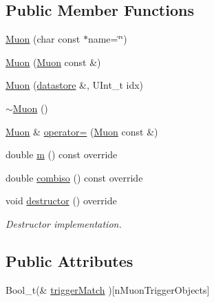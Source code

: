 \subsection*{Public Member Functions}
\begin{DoxyCompactItemize}
\item 
\hyperlink{classpanda_1_1Muon_abbf14d500569593961806573acc254ea}{Muon} (char const $\ast$name=\char`\"{}\char`\"{})
\item 
\hyperlink{classpanda_1_1Muon_a250098913ac74eef61f952c1925c8c16}{Muon} (\hyperlink{classpanda_1_1Muon}{Muon} const \&)
\item 
\hyperlink{classpanda_1_1Muon_ae0f7f7985ce4cdd6031178bf136fd7f3}{Muon} (\hyperlink{structpanda_1_1Element_1_1datastore}{datastore} \&, UInt\_\-t idx)
\item 
\hyperlink{classpanda_1_1Muon_a018a7d87e4d8b9226182c8e668fa081f}{$\sim$Muon} ()
\item 
\hyperlink{classpanda_1_1Muon}{Muon} \& \hyperlink{classpanda_1_1Muon_a2f91424e93572f9efd189884d95efaf6}{operator=} (\hyperlink{classpanda_1_1Muon}{Muon} const \&)
\item 
double \hyperlink{classpanda_1_1Muon_ac5fc1640178d5b0d00dd3eefa6fd44fb}{m} () const override
\item 
double \hyperlink{classpanda_1_1Muon_a3eb5df88e49b5510c00a6f02ce61def0}{combiso} () const override
\item 
void \hyperlink{classpanda_1_1Muon_aa982002bedb53cacab127270c53e54e8}{destructor} () override
\begin{DoxyCompactList}\small\item\em Destructor implementation. \item\end{DoxyCompactList}\end{DoxyCompactItemize}
\subsection*{Public Attributes}
\begin{DoxyCompactItemize}
\item 
Bool\_\-t(\& \hyperlink{classpanda_1_1Muon_a30e551a04615de2f3d634cf7314f60ea}{triggerMatch} )\mbox{[}nMuonTriggerObjects\mbox{]}
\end{DoxyCompactItemize}
